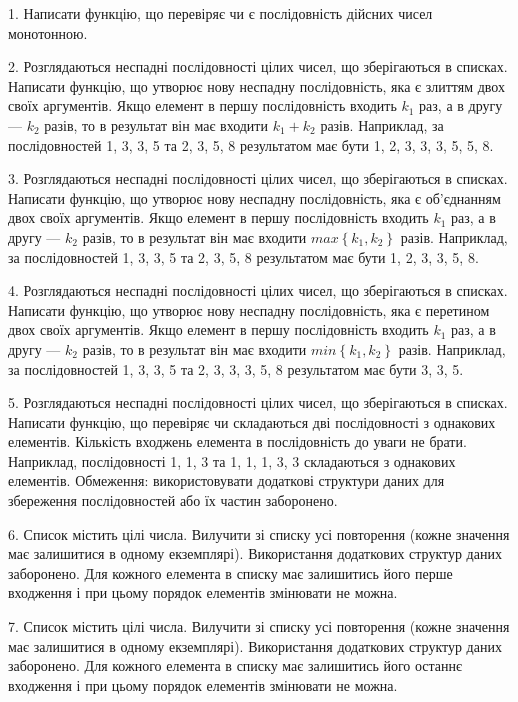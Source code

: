 \documentclass[10pt, ukrainian]{article}
\begin{document}
{
\begin {Large}

1. Написати функцію, що перевіряє чи є послідовність дійсних чисел монотонною.

2. Розглядаються неспадні послідовності цілих чисел, що зберігаються в списках. Написати функцію, що утворює нову неспадну послідовність, яка є злиттям двох своїх аргументів. Якщо елемент в першу послідовність входить $k_1$ раз, а в другу --- $k_2$ разів, то в результат він має входити $k_1+k_2$ разів. Наприклад, за послідовностей 1, 3, 3, 5 та 2, 3, 5, 8 результатом має бути 1, 2, 3, 3, 3, 5, 5, 8.

3. Розглядаються неспадні послідовності цілих чисел, що зберігаються в списках. Написати функцію, що утворює нову неспадну послідовність, яка є об'єднанням двох своїх аргументів. Якщо елемент в першу послідовність входить $k_1$ раз, а в другу --- $k_2$ разів, то в результат він має входити $max\left\{k_1,k_2\right\}$ разів. Наприклад, за послідовностей 1, 3, 3, 5 та 2, 3, 5, 8 результатом має бути 1, 2, 3, 3, 5, 8.

4. Розглядаються неспадні послідовності цілих чисел, що зберігаються в списках. Написати функцію, що утворює нову неспадну послідовність, яка є перетином двох своїх аргументів. Якщо елемент в першу послідовність входить $k_1$ раз, а в другу --- $k_2$ разів, то в результат він має входити $min\left\{k_1,k_2\right\}$ разів. Наприклад, за послідовностей 1, 3, 3, 5 та 2, 3, 3, 3, 5, 8 результатом має бути 3, 3, 5.

5. Розглядаються неспадні послідовності цілих чисел, що зберігаються в списках. Написати функцію, що перевіряє чи складаються дві послідовності з однакових елементів. Кількість входжень елемента в послідовність до уваги не брати. Наприклад, послідовності 1, 1, 3 та 1, 1, 1, 3, 3 складаються з однакових елементів. Обмеження: використовувати додаткові структури даних для збереження послідовностей або їх частин заборонено.

6. Список містить цілі числа. Вилучити зі списку усі повторення (кожне значення має залишитися в одному екземплярі). Використання додаткових структур даних заборонено. Для кожного елемента в списку має залишитись його перше входження і при цьому порядок елементів змінювати не можна.

\newpage

7. Список містить цілі числа. Вилучити зі списку усі повторення (кожне значення має залишитися в одному екземплярі). Використання додаткових структур даних заборонено. Для кожного елемента в списку має залишитись його останнє входження і при цьому порядок елементів змінювати не можна.


\end{Large}}
\end{document}
